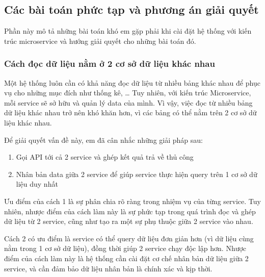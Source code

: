 \documentclass[./../main.tex]{subfiles}
\begin{document}
\subsection{Các bài toán phức tạp và phương án giải quyết}

Phần này mô tả những bài toán khó em gặp phải khi cài đặt hệ thống với
kiến trúc microservice và hướng giải quyết cho những bài toán đó.

\hypertarget{cuxe1ch-ux111ux1ecdc-dux1eef-liux1ec7u-nux1eb1m-ux1edf-2-cux1a1-sux1edf-dux1eef-liux1ec7u-khuxe1c-nhau}{%
	\subsubsection{Cách đọc dữ liệu nằm ở 2 cơ sở dữ liệu khác
		nhau}\label{cuxe1ch-ux111ux1ecdc-dux1eef-liux1ec7u-nux1eb1m-ux1edf-2-cux1a1-sux1edf-dux1eef-liux1ec7u-khuxe1c-nhau}}

Một hệ thống luôn cần có khả năng đọc dữ liệu từ nhiều bảng khác nhau để
phục vụ cho những mục đích như thống kê, \ldots{} Tuy nhiên, với kiến
trúc Microservice, mỗi service sẽ sở hữu và quản lý data của mình. Vì
vậy, việc đọc từ nhiều bảng dữ liệu khác nhau trở nên khó khăn hơn, vì
các bảng có thể nằm trên 2 cơ sở dữ liệu khác nhau.

Để giải quyết vấn đề này, em đã cân nhắc những giải pháp sau:

\begin{enumerate}
	\def\labelenumi{\arabic{enumi}.}
	\item

	      Gọi API tới cả 2 service và ghép kết quả trả về thủ công

	\item

	      Nhân bản data giữa 2 service để giúp service thực hiện query trên 1 cơ
	      sở dữ liệu duy nhất

\end{enumerate}

Ưu điểm của cách 1 là sự phân chia rõ ràng trong nhiệm vụ của từng
service. Tuy nhiên, nhược điểm của cách làm này là sự phức tạp trong quá
trình đọc và ghép dữ liệu từ 2 service, cũng như tạo ra một sự phụ thuộc
giữa 2 service vào nhau.

Cách 2 có ưu điểm là service có thể query dữ liệu đơn giản hơn (vì dữ
liệu cùng nằm trong 1 cơ sở dữ liệu), đồng thời giúp 2 service chạy độc
lập hơn. Nhược điểm của cách làm này là hệ thống cần cài đặt cơ chế nhân
bản dữ liệu giữa 2 service, và cần đảm bảo dữ liệu nhân bản là chính xác
và kịp thời.
\end{document}
